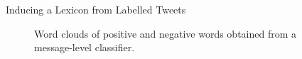 \documentclass[handout]{beamer}
\begin{document}
\begin{frame}{Inducing a Lexicon from Labelled Tweets}
\begin{figure}[htb]
\begin{center}
\caption{Word clouds of positive and negative words obtained from a message-level classifier.}
\label{fig:wordcloud}
\end{center}
\end{figure}
\end{frame}
\end{document}
